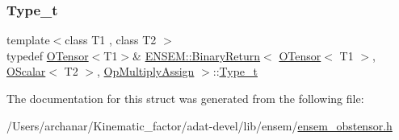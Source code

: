 \mbox{\label{structENSEM_1_1BinaryReturn_3_01OTensor_3_01T1_01_4_00_01OScalar_3_01T2_01_4_00_01OpMultiplyAssign_01_4_ad42bea7881ddc7ca27cdfff7655d17fe}} 
\subsubsection{\texorpdfstring{Type\_t}{Type\_t}\hspace{0.1cm}{\footnotesize\ttfamily [3/3]}}
{\footnotesize\ttfamily template$<$class T1 , class T2 $>$ \\
typedef \mbox{\hyperlink{classENSEM_1_1OTensor}{O\+Tensor}}$<$T1$>$\& \mbox{\hyperlink{structENSEM_1_1BinaryReturn}{E\+N\+S\+E\+M\+::\+Binary\+Return}}$<$ \mbox{\hyperlink{classENSEM_1_1OTensor}{O\+Tensor}}$<$ T1 $>$, \mbox{\hyperlink{classENSEM_1_1OScalar}{O\+Scalar}}$<$ T2 $>$, \mbox{\hyperlink{structENSEM_1_1OpMultiplyAssign}{Op\+Multiply\+Assign}} $>$\+::\mbox{\hyperlink{structENSEM_1_1BinaryReturn_3_01OTensor_3_01T1_01_4_00_01OScalar_3_01T2_01_4_00_01OpMultiplyAssign_01_4_ad42bea7881ddc7ca27cdfff7655d17fe}{Type\+\_\+t}}}



The documentation for this struct was generated from the following file\+:\begin{DoxyCompactItemize}
\item 
/\+Users/archanar/\+Kinematic\+\_\+factor/adat-\/devel/lib/ensem/\mbox{\hyperlink{adat-devel_2lib_2ensem_2ensem__obstensor_8h}{ensem\+\_\+obstensor.\+h}}\end{DoxyCompactItemize}
